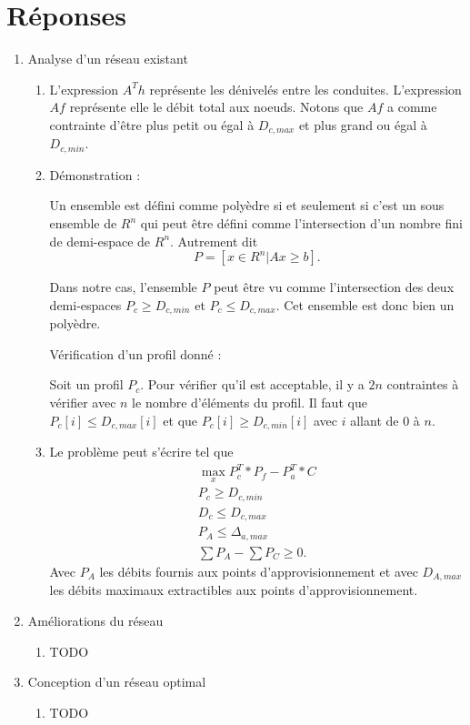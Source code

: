 \documentclass[french]{article}
\begin{document}
\section{Réponses}
\begin{enumerate}
	\item Analyse d'un réseau existant
	\begin{enumerate}[label=\theenumi.\arabic*]
		\item 
			L'expression $A^T h$ représente les dénivelés entre les conduites.
			L'expression $Af$ représente elle le débit total aux noeuds.
			Notons que $Af$ a comme contrainte d'être plus petit ou égal à $D_{c,max}$ et plus grand ou égal à $D_{c,min}$.
		\item 
			Démonstration :
			
			Un ensemble est défini comme polyèdre si et seulement si c'est un sous ensemble de $R^n$ qui peut être défini comme l'intersection d'un nombre fini de demi-espace de $R^n$. Autrement dit $$P=\left[x \in R^n |Ax\geq b\right].$$
			
			Dans notre cas, l'ensemble $P$ peut être vu comme l'intersection des deux demi-espaces $P_c\geq D_{c,min}$ et $P_c\leq D_{c,max}$.
			Cet ensemble est donc bien un polyèdre.
			
			Vérification d'un profil donné :
			
			Soit un profil $P_c$.
			Pour vérifier qu'il est acceptable, il y a $2n$ contraintes à vérifier avec $n$ le nombre d'éléments du profil.
			Il faut que $P_c[i]\leq D_{c,max}[i]$ et que $P_c[i]\geq D_{c,min}[i]$ avec $i$ allant de $0$ à $n$.
		\item 
			Le problème peut s'écrire tel que
			\begin{align*}
				\max_x P_c^T*P_f - P_a^T * C\\
				P_c\geq D_{c,min}\\
				D_c\leq D_{c,max}\\
				P_A\leq \Delta_{a,max}\\
				\sum P_A - \sum P_C \geq 0.
			\end{align*}
			Avec $P_A$ les débits fournis aux points d'approvisionnement et avec $D_{A,max}$ les débits maximaux extractibles aux points d'approvisionnement.
	\end{enumerate}

	\item Améliorations du réseau
	\begin{enumerate}[label=\theenumi.\arabic*]
		\item TODO
	\end{enumerate}
	\item Conception d'un réseau optimal
	\begin{enumerate}[label=\theenumi.\arabic*]
		\item TODO
	\end{enumerate}
\end{enumerate}
\end{document}
